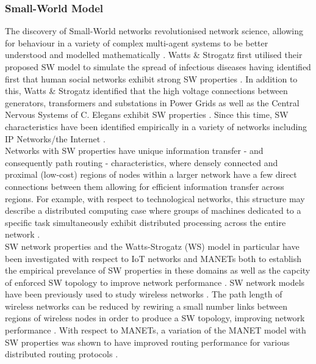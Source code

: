 \documentclass[
	a4paper, %
	10pt, %
	unnumberedsections, %
	twoside, %
]{LTJournalArticle}
\begin{document}
\subsubsection{Small-World Model} 

The discovery of Small-World networks revolutionised network science, allowing for behaviour in a variety of complex multi-agent systems to be better understood and modelled mathematically \cite{telesford:11}. Watts \& Strogatz first utilised their proposed SW model to simulate the spread of infectious diseases having identified first that human social networks exhibit strong SW properties \cite{watts:98}. In addition to this, Watts \& Strogatz identified that the high voltage connections between generators, transformers and substations in Power Grids as well as the Central Nervous Systems of C. Elegans exhibit SW properties \cite{watts:98}. Since this time, SW characteristics have been identified empirically in a variety of networks including IP Networks/the Internet \cite{telesford:11}. \\

Networks with SW properties have unique information transfer - and consequently path routing - characteristics, where densely connected and proximal (low-cost) regions of nodes within a larger network have a few direct connections between them allowing for efficient information transfer across regions. For example, with respect to technological networks, this structure may describe a distributed computing case where groups of machines dedicated to a specific task simultaneously exhibit distributed processing across the entire network \cite{telesford:11}. \\

SW network properties and the Watts-Strogatz (WS) model in particular have been investigated with respect to IoT networks and MANETs both to establish the empirical prevelance of SW properties in these domains as well as the capcity of enforced SW topology to improve network performance \cite{sohn:17} \cite{dong:15}. SW network models have been previously used to study wireless networks \cite{sohn:17}. The path length of wireless networks can be reduced by rewiring a small number links between regions of wireless nodes in order to produce a SW topology, improving network performance \cite{helmy:03}. With respect to MANETs, a variation of the MANET model with SW properties was shown to have improved routing performance for various  distributed routing protocols \cite{dong:15}. \\
\end{document}
